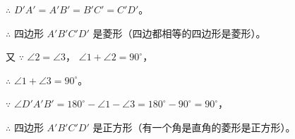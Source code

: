 $\therefore$ \quad $D'A' = A'B' = B'C' = C'D'$。

$\therefore$ \quad 四边形 $A'B'C'D'$ 是菱形（四边都相等的四边形是菱形）。

又 $\because$ \quad $\angle 2 = \angle 3$， $\angle 1 + \angle 2 = 90^\circ$，

$\therefore$ \quad $\angle 1 + \angle 3 = 90^\circ$。

$\because$ \quad $\angle D'A'B' = 180^\circ - \angle 1 - \angle 3 = 180^\circ - 90^\circ = 90^\circ$，

$\therefore$ \quad 四边形 $A'B'C'D'$ 是正方形（有一个角是直角的菱形是正方形）。


\begin{lianxi}





\end{lianxi}


